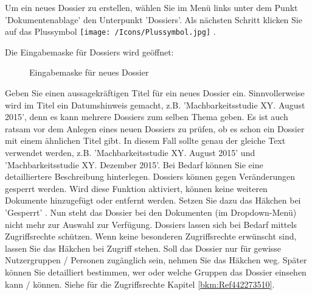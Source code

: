 Um ein neues Dossier zu erstellen, wählen Sie im Menü links unter dem Punkt 'Dokumentenablage' den Unterpunkt 'Dossiers'. Als nächsten Schritt klicken Sie auf das Plussymbol \texttt{[image: /Icons/Plussymbol.jpg]} .

\vspace{\baselineskip}

Die Eingabemaske für Dossiers wird geöffnet:

\begin{figure}[H]
\caption{Eingabemaske für neues Dossier}
\end{figure}

Geben Sie einen aussagekräftigen Titel  für ein neues Dossier ein. Sinnvollerweise wird im Titel ein Datumshinweis gemacht, z.B. 'Machbarkeitsstudie XY. August 2015', denn es kann mehrere Dossiers zum selben Thema geben. Es ist auch ratsam vor dem Anlegen eines neuen Dossiers zu prüfen, ob es schon ein Dossier mit einem ähnlichen Titel gibt. In diesem Fall sollte genau der gleiche Text verwendet werden, z.B. 'Machbarkeitsstudie XY. August 2015' und 'Machbarkeitsstudie XY. Dezember 2015'. Bei Bedarf können Sie eine detailliertere Beschreibung  hinterlegen. Dossiers können gegen Veränderungen gesperrt werden. Wird diese Funktion aktiviert, können keine weiteren Dokumente hinzugefügt oder entfernt werden. Setzen Sie dazu das Häkchen bei 'Gesperrt' . Nun steht das Dossier bei den Dokumenten (im Dropdown-Menü) nicht mehr zur Auswahl zur Verfügung. Dossiers lassen sich bei Bedarf mittels Zugriffsrechte schützen. Wenn keine besonderen Zugriffsrechte erwünscht sind, lassen Sie das Häkchen bei Zugriff  stehen. Soll das Dossier nur für gewisse Nutzergruppen / Personen zugänglich sein, nehmen Sie das Häkchen weg. Später können Sie detailliert bestimmen, wer oder welche Gruppen das Dossier einsehen kann / können. Siehe für die Zugriffsrechte Kapitel \ref{bkm:Ref442273510}. \newline

